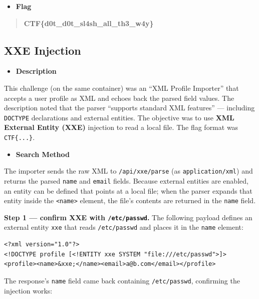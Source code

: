 \documentclass[11pt]{article}
\begin{document}
\begin{itemize}[leftmargin=1.5em]
    \item \textbf{Flag}
\end{itemize}
\begin{quote}
\textbf{CTF\{d0t\_d0t\_sl4sh\_all\_th3\_w4y\}}
\end{quote}

\subsection{XXE Injection}

\begin{itemize}[leftmargin=1.5em]
    \item \textbf{Description}
\end{itemize}
\noindent This challenge (on the same container) was an ``XML Profile Importer'' that accepts a user profile as XML and echoes back the parsed field values. The description noted that the parser ``supports standard XML features'' --- including \texttt{DOCTYPE} declarations and external entities. The objective was to use \textbf{XML External Entity (XXE)} injection to read a local file. The flag format was \texttt{CTF\{...\}}.

\begin{itemize}[leftmargin=1.5em]
    \item \textbf{Search Method}
\end{itemize}
\noindent The importer sends the raw XML to \texttt{/api/xxe/parse} (as \texttt{application/xml}) and returns the parsed \texttt{name} and \texttt{email} fields. Because external entities are enabled, an entity can be defined that points at a local file; when the parser expands that entity inside the \texttt{<name>} element, the file's contents are returned in the \texttt{name} field.

\noindent \textbf{Step 1 --- confirm XXE with \texttt{/etc/passwd}.} The following payload defines an external entity \texttt{xxe} that reads \texttt{/etc/passwd} and places it in the \texttt{name} element:

\begin{footnotesize}
\begin{verbatim}
<?xml version="1.0"?>
<!DOCTYPE profile [<!ENTITY xxe SYSTEM "file:///etc/passwd">]>
<profile><name>&xxe;</name><email>a@b.com</email></profile>
\end{verbatim}
\end{footnotesize}

\noindent The response's \texttt{name} field came back containing \texttt{/etc/passwd}, confirming the injection works:
\end{document}
